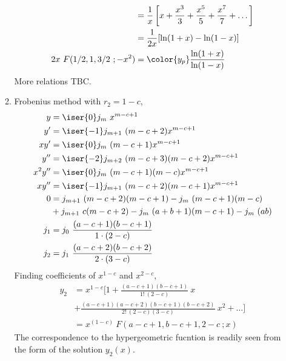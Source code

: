 \begin{enumerate}
\begin{enumerate}
\begin{align}
                                                & =\frac{1}{x} \left[ x + \frac{x^3}{3}
                        + \frac{x^5}{5} + \frac{x^7}{7} + \dots \right]                 \\
                                                & = \frac{1}{2x} [\ln(1+x) - \ln(1-x)]  \\
                        2x\ F(1/2,1,3/2\ ;-x^2) & = \color{y_p}
                        \frac{\ln(1+x)}{\ln(1-x)}
                    \end{align}
                    More relations TBC.

              \item Frobenius method with $ r_2 = 1-c $,
                    \begin{align}
                        y       & = \iser{0} j_m\ x^{m-c+1}                     \\
                        y'      & = \iser{-1} j_{m+1}\ (m-c+2)x^{m-c+1}         \\
                        xy'     & = \iser{0} j_m\ (m-c+1)x^{m-c+1}              \\
                        y''     & = \iser{-2} j_{m+2}\ (m-c+3)(m-c+2)x^{m-c+1}  \\
                        x^2 y'' & = \iser{0} j_m\ (m-c+1)(m-c)x^{m-c+1}         \\
                        xy''    & = \iser{-1} j_{m+1}\ (m-c+2)(m-c+1)x^{m-c+1}  \\
                        0       & = j_{m+1}\ (m-c+2)(m-c+1) - j_m\ (m-c+1)(m-c) \\
                                & + j_{m+1}\ c(m-c+2) - j_{m}\ (a+b+1)(m-c+1)
                        - j_m\ (ab)                                             \\
                        j_1     & = j_0\ \frac{(a-c+1)(b-c+1)}{1\cdot(2-c)}     \\
                        j_2     & = j_1\ \frac{(a-c+2)(b-c+2)}{2\cdot(3-c)}
                    \end{align}
                    Finding coefficients of $ x^{1-c} $ and $ x^{2-c} $,
                    \begin{align}
                        y_2 & = x^{1-c} \Bigg[ 1 + \frac{(a-c+1)(b-c+1)}{1!\ (2-c)}\ x \\
                            & + \frac{(a-c+1)(a-c+2)(b-c+1)(b-c+2)}{2!\ (2-c)(3-c)}
                        \ x^2 + \dots \Bigg]                                           \\
                            & = x^{(1-c)}\ F(a-c+1, b-c+1, 2-c\ ; x)
                    \end{align}
                    The correspondence to the hypergeometric fucntion is readily seen
                    from the form of the solution $ y_2(x) $.


\end{enumerate}
\end{enumerate}
